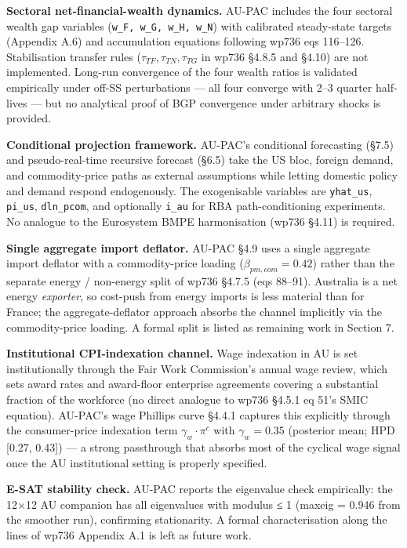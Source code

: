 \documentclass[
]{article}
\begin{document}
\textbf{Sectoral net-financial-wealth dynamics.} AU-PAC includes the
four sectoral wealth gap variables (\texttt{w\_F,\ w\_G,\ w\_H,\ w\_N})
with calibrated steady-state targets (Appendix A.6) and accumulation
equations following wp736 eqs 116--126. Stabilisation transfer rules
(\(\tau_{TF}, \tau_{TN}, \tau_{TG}\) in wp736 §4.8.5 and §4.10) are not
implemented. Long-run convergence of the four wealth ratios is validated
empirically under off-SS perturbations --- all four converge with 2--3
quarter half-lives --- but no analytical proof of BGP convergence under
arbitrary shocks is provided.

\textbf{Conditional projection framework.} AU-PAC's conditional
forecasting (§7.5) and pseudo-real-time recursive forecast (§6.5) take
the US bloc, foreign demand, and commodity-price paths as external
assumptions while letting domestic policy and demand respond
endogenously. The exogenisable variables are \texttt{yhat\_us},
\texttt{pi\_us}, \texttt{dln\_pcom}, and optionally \texttt{i\_au} for
RBA path-conditioning experiments. No analogue to the Eurosystem BMPE
harmonisation (wp736 §4.11) is required.

\textbf{Single aggregate import deflator.} AU-PAC §4.9 uses a single
aggregate import deflator with a commodity-price loading
(\(\beta_{pm,com} = 0.42\)) rather than the separate energy / non-energy
split of wp736 §4.7.5 (eqs 88--91). Australia is a net energy
\emph{exporter}, so cost-push from energy imports is less material than
for France; the aggregate-deflator approach absorbs the channel
implicitly via the commodity-price loading. A formal split is listed as
remaining work in Section 7.

\textbf{Institutional CPI-indexation channel.} Wage indexation in AU is
set institutionally through the Fair Work Commission's annual wage
review, which sets award rates and award-floor enterprise agreements
covering a substantial fraction of the workforce (no direct analogue to
wp736 §4.5.1 eq 51's SMIC equation). AU-PAC's wage Phillips curve §4.4.1
captures this explicitly through the consumer-price indexation term
\(\gamma_w \cdot \pi^c\) with \(\gamma_w = 0.35\) (posterior mean; HPD
{[}0.27, 0.43{]}) --- a strong passthrough that absorbs most of the
cyclical wage signal once the AU institutional setting is properly
specified.

\textbf{E-SAT stability check.} AU-PAC reports the eigenvalue check
empirically: the 12×12 AU companion has all eigenvalues with modulus ≤ 1
(max\textbar eig\textbar{} = 0.946 from the smoother run), confirming
stationarity. A formal characterisation along the lines of wp736
Appendix A.1 is left as future work.
\end{document}
